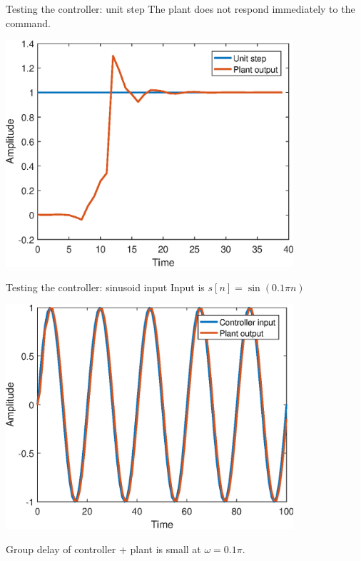 \documentclass[10pt]{beamer}
\begin{document}
%
\begin{frame}{Testing the controller: unit step}
The plant does not respond immediately to the command.
\begin{center}
	\includegraphics[width=0.8\textwidth]{../homework/figs/inverse_control_unit_step.eps}
\end{center}
\end{frame}

%
\begin{frame}{Testing the controller: sinusoid input}
Input is $s[n] = \sin(0.1\pi n)$
\begin{center}
\includegraphics[width=0.8\textwidth]{../homework/figs/inverse_control_sin1.eps}
\end{center}

Group delay of controller + plant is small at $\omega = 0.1\pi$.
\end{frame}
\end{document}
